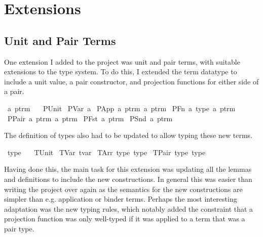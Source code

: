 \section{Extensions}
\subsection{Unit and Pair Terms}
\label{sec:pairs}
One extension I added to the project was unit and pair terms, with suitable extensions to the type system.
To do this, I extended the term datatype to include a unit value, a pair constructor, and projection functions for either side of a pair.

\begin{implementation}
\isamarkupfalse%
\ {\isacharprime}a\ ptrm\ {\isacharequal}\isanewline
\ \ PUnit\isanewline
{\isacharbar}\ PVar\ {\isacharprime}a\isanewline
{\isacharbar}\ PApp\ {\isachardoublequoteopen}{\isacharprime}a\ ptrm{\isachardoublequoteclose}\ {\isachardoublequoteopen}{\isacharprime}a\ ptrm{\isachardoublequoteclose}\isanewline
{\isacharbar}\ PFn\ {\isacharprime}a\ type\ {\isachardoublequoteopen}{\isacharprime}a\ ptrm{\isachardoublequoteclose}\isanewline
{\isacharbar}\ PPair\ {\isachardoublequoteopen}{\isacharprime}a\ ptrm{\isachardoublequoteclose}\ {\isachardoublequoteopen}{\isacharprime}a\ ptrm{\isachardoublequoteclose}\isanewline
{\isacharbar}\ PFst\ {\isachardoublequoteopen}{\isacharprime}a\ ptrm{\isachardoublequoteclose}\isanewline
{\isacharbar}\ PSnd\ {\isachardoublequoteopen}{\isacharprime}a\ ptrm{\isachardoublequoteclose}\isanewline
\end{implementation}

The definition of types also had to be updated to allow typing these new terms.

\begin{implementation}
\isamarkupfalse%
\ type\ {\isacharequal}\isanewline
\ \ TUnit\isanewline
{\isacharbar}\ TVar\ tvar\isanewline
{\isacharbar}\ TArr\ type\ type\isanewline
{\isacharbar}\ TPair\ type\ type\isanewline
\end{implementation}

Having done this, the main task for this extension was updating all the lemmas and definitions to include the new constructions.
In general this was easier than writing the project over again as the semantics for the new constructions are simpler than e.g. application or binder terms.
Perhaps the most interesting adaptation was the new typing rules, which notably added the constraint that a projection function was only well-typed if it was applied to a term that was a pair type.

